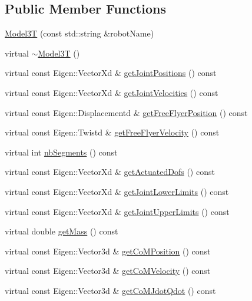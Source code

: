 \subsection*{Public Member Functions}
\begin{DoxyCompactItemize}
\item 
\hyperlink{classModel3T_afbcee4d1130a7020034027aafd9eecf6}{Model3T} (const std\+::string \&robot\+Name)
\item 
virtual \hyperlink{classModel3T_a6dedc34c9fefff7bd94d7c482eab04d1}{$\sim$\+Model3T} ()
\item 
virtual const Eigen\+::\+Vector\+Xd \& \hyperlink{classModel3T_abcaa7a21ab72837d469e5b13db23f0bc}{get\+Joint\+Positions} () const
\item 
virtual const Eigen\+::\+Vector\+Xd \& \hyperlink{classModel3T_adb503d550d97093a65f19e55725865ca}{get\+Joint\+Velocities} () const
\item 
virtual const Eigen\+::\+Displacementd \& \hyperlink{classModel3T_ab9a2a5644b40341af54e408dd8d1b0de}{get\+Free\+Flyer\+Position} () const
\item 
virtual const Eigen\+::\+Twistd \& \hyperlink{classModel3T_aa2b2a35af047f4fd539131e87ee3af2a}{get\+Free\+Flyer\+Velocity} () const
\item 
virtual int \hyperlink{classModel3T_af8ca577236d173d0f7860263fb7872a4}{nb\+Segments} () const
\item 
virtual const Eigen\+::\+Vector\+Xd \& \hyperlink{classModel3T_aad7041820bf886ee965b05611bdedfd0}{get\+Actuated\+Dofs} () const
\item 
virtual const Eigen\+::\+Vector\+Xd \& \hyperlink{classModel3T_aea8da0b07db1efd0a8f578f0afad2372}{get\+Joint\+Lower\+Limits} () const
\item 
virtual const Eigen\+::\+Vector\+Xd \& \hyperlink{classModel3T_a5b2add8312e0251e43cd1027a6a72056}{get\+Joint\+Upper\+Limits} () const
\item 
virtual double \hyperlink{classModel3T_a226c740338e57180fafed23181d1ca85}{get\+Mass} () const
\item 
virtual const Eigen\+::\+Vector3d \& \hyperlink{classModel3T_ad81ca6213b967fb62d8c1682c3389736}{get\+Co\+M\+Position} () const
\item 
virtual const Eigen\+::\+Vector3d \& \hyperlink{classModel3T_abe65ef07b4e6c61f6567c1f007631081}{get\+Co\+M\+Velocity} () const
\item 
virtual const Eigen\+::\+Vector3d \& \hyperlink{classModel3T_a408213f442ab7287c44e86e6d72f825c}{get\+Co\+M\+Jdot\+Qdot} () const

\end{DoxyCompactItemize}
